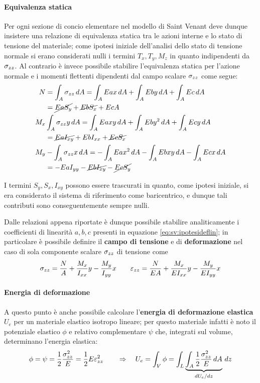 		\paragraph{Equivalenza statica} Per ogni sezione di concio elementare nel modello di Saint Venant deve dunque insistere una relazione di equivalenza statica tra le azioni interne e lo stato di tensione del materiale; come ipotesi iniziale dell'analisi dello stato di tensione normale si erano considerati nulli i termini $T_x,T_y,M_z$ in quanto indipendenti da $\sigma_{zz}$. Al contrario è invece possibile stabilire l'equivalenza statica per l'azione normale e i momenti flettenti dipendenti dal campo scalare $\sigma_{zz}$ come segue:
		\begin{align*}
			N & = \int_A \sigma_{zz} \, dA = \int_A Eax\, dA + \int_A Eby \, dA + \int_A Ec\, dA \\
			& = \cancel{EaS_y} + \cancel{EbS_x} + EcA  \\
			M_x & \int_A \sigma_{zz} y \, dA = \int_A Eaxy\, dA + \int_A Eby^2 \, dA + \int_A Ecy\, dA \\
			& = \cancel{EaI_{xy}} + EbI_{xx}+ \cancel{EcS_x}  \\
			M_y & -\int_A \sigma_{zz} x \, dA = -\int_A Eax^2\, dA - \int_A Ebxy \, dA - \int_A Ecx\, dA \\
			& = -EaI_{yy} -\cancel{ EbI_{xy}}- \cancel{EcS_y}  
		\end{align*}
		\begin{nota}
			I termini $S_y,S_x,I_{xy}$ possono essere trascurati in quanto, come ipotesi iniziale, si era considerato il sistema di riferimento come baricentrico, e dunque tali contributi sono conseguentemente sempre nulli.
		\end{nota}
		
		\begin{concetto}
			Dalle relazioni appena riportate è dunque possibile stabilire analiticamente i coefficienti di linearità $a,b,c$ presenti in equazione \ref{eq:sv:ipotesideflin}; in particolare è possibile definire il \textbf{campo di tensione} e di \textbf{deformazione} nel caso di sola componente scalare $\sigma_{zz}$ di tensione come
			\begin{equation} \label{eq:sv:szznormale}
				\sigma_{zz} = \frac NA + \frac {M_x} {I_{xx}} y - \frac {M_y} {I_{yy}} x  \qquad \varepsilon_{zz} = \frac N{EA} + \frac {M_x} {EI_{xx}} y - \frac {M_y} {E I_{yy}} x
			\end{equation}
		\end{concetto}
	
		\paragraph{Energia di deformazione} A questo punto è anche possibile calcolare l'\textbf{energia di deformazione elastica} $U_e$ per un materiale elastico isotropo lineare; per questo materiale infatti è noto il  potenziale elastico $\phi$ e relativo complementare $\psi$ che, integrati sul volume, determinano l'energia elastica:
		\[ \phi = \psi = \frac 1 2 \frac {\sigma_{zz}^2}E = \frac 1 2 E \varepsilon_{zz}^2 \qquad \Rightarrow \quad U_e = \int_V \phi = \int_L \underbrace{\int_A \frac 1 2 \frac {\sigma_{zz}^2}E\, dA }_{dU_e/dz} \, dz \]
		
